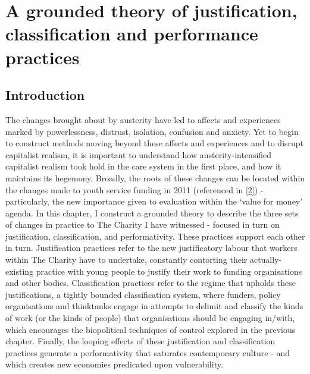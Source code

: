 \chapter{A grounded theory of justification, classification and performance practices}
\label{6}

\section{Introduction}
\label{sec:6-intro}


The changes brought about by austerity have led to affects and experiences marked by powerlessness, distrust, isolation, confusion and anxiety. Yet to begin to construct methods moving beyond these affects and experiences and to disrupt capitalist realism, it is important to understand how austerity-intensified capitalist realism took hold in the care system in the first place, and how it maintains its hegemony. Broadly, the roots of these changes can be located within the changes made to youth service funding in 2011 (referenced in \ref{2}) - particularly, the new importance given to evaluation within the ‘value for money’ agenda. In this chapter, I construct a grounded theory to describe the three sets of changes in practice to The Charity I have witnessed - focused in turn on justification, classification, and performativity. These practices support each other in turn. Justification practices refer to the new justificatory labour that workers within The Charity have to undertake, constantly contorting their actually-existing practice with young people to justify their work to funding organisations and other bodies. Classification practices refer to the regime that upholds these justifications, a tightly bounded classification system, where funders, policy organisations and thinktanks engage in attempts to delimit and classify the kinds of work (or the kinds of people) that organisations should be engaging in/with, which encourages the biopolitical techniques of control explored in the previous chapter. Finally, the looping effects of these justification and classification practices generate a performativity that saturates contemporary culture - and which creates new economies predicated upon vulnerability.

